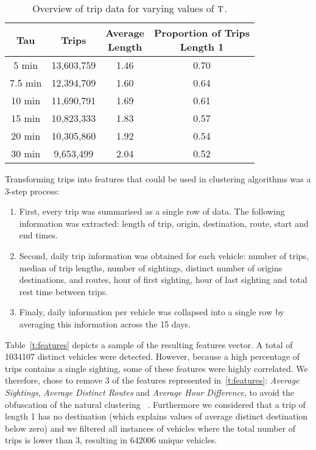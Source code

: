 \begin{table}[t]
\centering
\tabcolsep=0.25cm
\begin{tabular}{c c c c}
  \hline
Tau & Trips & \thead{Average\\Length} & \thead{Proportion of Trips \\ Length 1} \\
  \hline
5 min & 13,603,759 & 1.46 & 0.70 \\
7.5 min & 12,394,709 & 1.60 & 0.64 \\
10 min & 11,690,791 & 1.69 & 0.61 \\
15 min & 10,823,333 & 1.83 & 0.57 \\
20 min & 10,305,860 & 1.92 & 0.54 \\
30 min &  9,653,499 & 2.04 & 0.52 \\
   \hline
\end{tabular}
\caption{Overview of trip data for varying values of $\mathrm{T}$.}
\label{t:trips-tau}
\end{table}

Transforming trips into features that could be used in clustering algorithms was a 3-step process:
\begin{enumerate}
  \item First, every trip was summarised as a single row of data. The following information was extracted: length of trip, origin, destination, route, start and end times.
  \item Second, daily trip information was obtained for each vehicle: number of trips, median of trip lengths, number of sightings, distinct number of origins destinations, and routes, hour of first sighting, hour of last sighting and total rest time between trips.
  \item Finaly, daily information per vehicle was collapsed into a single row by averaging this information across the 15 days.
\end{enumerate}

Table~\ref{t:features} depicts a sample of the resulting features vector. A total of 1034107 distinct vehicles were detected. However, because a high percentage of trips contains a single sighting, some of these features were highly correlated. We therefore, chose to remove 3 of the features represented in~\ref{t:features}: \emph{Average Sightings}, \emph{Average Distinct Routes} and \emph{Average Hour Difference}, to avoid the obfuscation of the natural clustering ~\cite{Kmeans}. Furthermore we considered that a trip of length 1 has no destination (which explains values of average distinct destination below zero) and we filtered all instances of vehicles where the total number of trips is lower than 3, resulting in 642006 unique vehicles.

